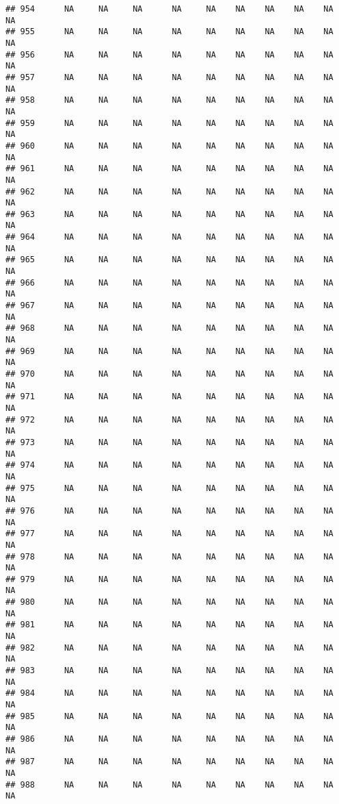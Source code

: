 \documentclass{article}\usepackage{graphicx, color}
\makeatletter
\newenvironment{kframe}{%
 \def\at@end@of@kframe{}%
 \ifinner\ifhmode%
  \def\at@end@of@kframe{\end{minipage}}%
  \begin{minipage}{\columnwidth}%
 \fi\fi%
 \def\FrameCommand##1{\hskip\@totalleftmargin \hskip-\fboxsep
 \colorbox{shadecolor}{##1}\hskip-\fboxsep
     \hskip-\linewidth \hskip-\@totalleftmargin \hskip\columnwidth}%
 \MakeFramed {\advance\hsize-\width
   \@totalleftmargin\z@ \linewidth\hsize
   \@setminipage}}%
 {\par\unskip\endMakeFramed%
 \at@end@of@kframe}
\newenvironment{knitrout}{}{} %
\makeatother
\begin{document}
\begin{knitrout}
\begin{kframe}
\begin{verbatim}
## 954      NA     NA     NA      NA     NA    NA    NA    NA    NA     NA
## 955      NA     NA     NA      NA     NA    NA    NA    NA    NA     NA
## 956      NA     NA     NA      NA     NA    NA    NA    NA    NA     NA
## 957      NA     NA     NA      NA     NA    NA    NA    NA    NA     NA
## 958      NA     NA     NA      NA     NA    NA    NA    NA    NA     NA
## 959      NA     NA     NA      NA     NA    NA    NA    NA    NA     NA
## 960      NA     NA     NA      NA     NA    NA    NA    NA    NA     NA
## 961      NA     NA     NA      NA     NA    NA    NA    NA    NA     NA
## 962      NA     NA     NA      NA     NA    NA    NA    NA    NA     NA
## 963      NA     NA     NA      NA     NA    NA    NA    NA    NA     NA
## 964      NA     NA     NA      NA     NA    NA    NA    NA    NA     NA
## 965      NA     NA     NA      NA     NA    NA    NA    NA    NA     NA
## 966      NA     NA     NA      NA     NA    NA    NA    NA    NA     NA
## 967      NA     NA     NA      NA     NA    NA    NA    NA    NA     NA
## 968      NA     NA     NA      NA     NA    NA    NA    NA    NA     NA
## 969      NA     NA     NA      NA     NA    NA    NA    NA    NA     NA
## 970      NA     NA     NA      NA     NA    NA    NA    NA    NA     NA
## 971      NA     NA     NA      NA     NA    NA    NA    NA    NA     NA
## 972      NA     NA     NA      NA     NA    NA    NA    NA    NA     NA
## 973      NA     NA     NA      NA     NA    NA    NA    NA    NA     NA
## 974      NA     NA     NA      NA     NA    NA    NA    NA    NA     NA
## 975      NA     NA     NA      NA     NA    NA    NA    NA    NA     NA
## 976      NA     NA     NA      NA     NA    NA    NA    NA    NA     NA
## 977      NA     NA     NA      NA     NA    NA    NA    NA    NA     NA
## 978      NA     NA     NA      NA     NA    NA    NA    NA    NA     NA
## 979      NA     NA     NA      NA     NA    NA    NA    NA    NA     NA
## 980      NA     NA     NA      NA     NA    NA    NA    NA    NA     NA
## 981      NA     NA     NA      NA     NA    NA    NA    NA    NA     NA
## 982      NA     NA     NA      NA     NA    NA    NA    NA    NA     NA
## 983      NA     NA     NA      NA     NA    NA    NA    NA    NA     NA
## 984      NA     NA     NA      NA     NA    NA    NA    NA    NA     NA
## 985      NA     NA     NA      NA     NA    NA    NA    NA    NA     NA
## 986      NA     NA     NA      NA     NA    NA    NA    NA    NA     NA
## 987      NA     NA     NA      NA     NA    NA    NA    NA    NA     NA
## 988      NA     NA     NA      NA     NA    NA    NA    NA    NA     NA

\end{verbatim}
\end{kframe}
\end{knitrout}
\end{document}
